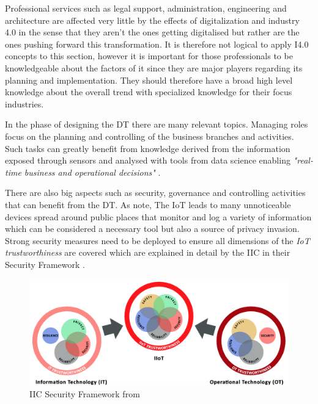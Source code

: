 Professional services such as legal support, administration, engineering and architecture are affected very little by the effects of digitalization and industry 4.0 in the sense that they aren't the ones getting digitalised but rather are the ones pushing forward this transformation. It is therefore not logical to apply \ac{I4.0} concepts to this section, however it is important for those professionals to be knowledgeable about the factors of it since they are major players regarding its planning and implementation. They should therefore have a broad high level knowledge about the overall trend with specialized knowledge for their focus industries.

In the phase of designing the \ac{DT} there are many relevant topics. Managing roles focus on the planning and controlling of the business branches and activities. Such tasks can greatly benefit from knowledge derived from the information exposed through sensors and analysed with tools from data science enabling \emph{"real-time business and operational decisions"} \cite[p.84]{iicarchitecture:2016}.

There are also big aspects such as security, governance and controlling activities that can benefit from the \ac{DT}. As \citeauthor{Tragos2016trusted} note, The \ac{IoT} leads to many unnoticeable devices spread around public places that monitor and log a variety of information which can be considered a necessary tool but also a source of privacy invasion. Strong security measures need to be deployed to ensure all dimensions of the \emph{\ac{IoT} trustworthiness} are covered which are explained in detail by the \ac{IIC} in their Security Framework \cite{iicsecurity:2016}.

\begin{figure}
\centering
\includegraphics[width=1\columnwidth]{images/iic-iiot-trustworthiness}
\caption{\ac{IIC} Security Framework from \citeauthor{iicsecurity:2016} \cite{iicsecurity:2016}}
\end{figure}

